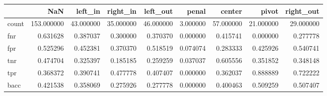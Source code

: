 \begin{tabular}{lrrrrrrrr}
\toprule
{} &         NaN &    left\_in &   right\_in &   left\_out &     penal &     center &      pivot &  right\_out \\
\midrule
count &  153.000000 &  43.000000 &  35.000000 &  46.000000 &  3.000000 &  57.000000 &  21.000000 &  29.000000 \\
fnr   &    0.631628 &   0.387037 &   0.300000 &   0.370370 &  0.000000 &   0.415741 &   0.000000 &   0.277778 \\
fpr   &    0.525296 &   0.452381 &   0.370370 &   0.518519 &  0.074074 &   0.283333 &   0.425926 &   0.540741 \\
tnr   &    0.474704 &   0.325397 &   0.185185 &   0.259259 &  0.037037 &   0.605556 &   0.351852 &   0.348148 \\
tpr   &    0.368372 &   0.390741 &   0.477778 &   0.407407 &  0.000000 &   0.362037 &   0.888889 &   0.722222 \\
bacc  &    0.421538 &   0.358069 &   0.275926 &   0.277778 &  0.000000 &   0.400463 &   0.509259 &   0.507407 \\
\bottomrule
\end{tabular}

